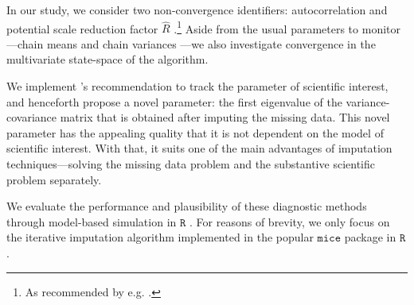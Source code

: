 \documentclass{article}
\begin{document}
In our study, we consider two non-convergence identifiers: autocorrelation \citep[conform][p.~147]{lync07} and potential scale reduction factor $\widehat{R}$ \citep[conform][p.~5]{veht19}.\footnote{As recommended by e.g. \citet{cowl96}.} Aside from the usual parameters to monitor---chain means and chain variances \citep[\(\S\) 4.5.6]{buur18}---we also investigate convergence in the multivariate state-space of the algorithm. 

We implement \citet[\(\S\) 6.5.1]{buur18}'s recommendation to track the parameter of scientific interest, and henceforth propose a novel parameter: the first eigenvalue of the variance-covariance matrix that is obtained after imputing the missing data. This novel parameter has the appealing quality that it is not dependent on the model of scientific interest. With that, it suits one of the main advantages of imputation techniques---solving the missing data problem and the substantive scientific problem separately.



% 
% 

We evaluate the performance and plausibility of these diagnostic methods through model-based simulation in $\mathtt{R}$ \citep{R}. For reasons of brevity, we only focus on the iterative imputation algorithm implemented in the popular $\mathtt{mice}$ package in $\mathtt{R}$ \citep{mice}. 
\end{document}
